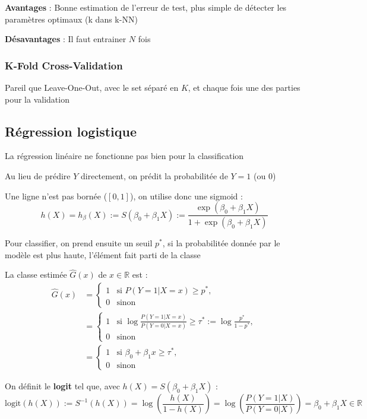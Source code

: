 \documentclass[12pt,a4paper]{article}
\begin{document}
\textbf{Avantages} : Bonne estimation de l'erreur de test, plus simple de détecter les paramètres optimaux (k dans k-NN)

\textbf{Désavantages} : Il faut entrainer $N$ fois


\subsubsection{K-Fold Cross-Validation}

Pareil que Leave-One-Out, avec le set séparé en $K$, et chaque fois une des parties pour la validation

\subsection{Régression logistique}

La régression linéaire ne fonctionne pas bien pour la classification

\medskip

Au lieu de prédire $Y$ directement, on prédit la probabilitée de $Y = 1$ (ou $0$)

Une ligne n'est pas bornée ($[0,1]$), on utilise donc une sigmoid :
$$h(X) = h_\beta(X) := S(\beta_0 + \beta_1 X) := \frac{\exp(\beta_0 + \beta_1 X)}{1 + \exp(\beta_0 + \beta_1 X)}$$

Pour classifier, on prend ensuite un seuil $p^*$, si la probabilitée donnée par le modèle est plus haute, l'élément fait parti de la classe

La classe estimée $\hat{G}(x)$ de $x\in \mathbb{R}$ est :
\begin{align*}
\hat{G}(x) &= \begin{cases} 
1 & \text{si } P(Y=1|X=x) \ge p^*, \\
0 & \text{sinon}
\end{cases} \\
&= \begin{cases} 
1 & \text{si } \log \frac{P(Y=1|X=x)}{P(Y=0|X=x)} \ge \tau^* := \log \frac{p^*}{1-p^*}, \\
0 & \text{sinon}
\end{cases} \\
&= \begin{cases} 
1 & \text{si } \beta_0 + \beta_1 x \ge \tau^*, \\
0 & \text{sinon}
\end{cases}
\end{align*}

On définit le \textbf{logit} tel que, avec $h(X) = S(\beta_0 + \beta_1 X)$ :
$$\text{logit}(h(X)) := S^{-1}(h(X)) = \log\left(\frac{h(X)}{1 - h(X)}\right) = \log\left(\frac{P(Y=1|X)}{P(Y=0|X)}\right) = \beta_0 + \beta_1 X \in \mathbb{R}$$
\end{document}
